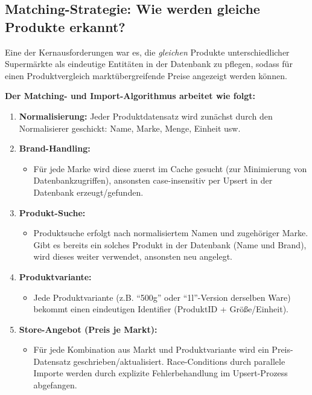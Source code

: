 \documentclass[12pt, a4paper]{report} %
\begin{document}
\subsection{Matching-Strategie: Wie werden gleiche Produkte erkannt?}

Eine der Kernausforderungen war es, die \emph{gleichen} Produkte unterschiedlicher Supermärkte als eindeutige Entitäten in der Datenbank zu pflegen, sodass für einen Produktvergleich marktübergreifende Preise angezeigt werden können.

\textbf{Der Matching- und Import-Algorithmus arbeitet wie folgt:}
\begin{enumerate}
    \item \textbf{Normalisierung:} Jeder Produktdatensatz wird zunächst durch den Normalisierer geschickt: Name, Marke, Menge, Einheit usw.
    \item \textbf{Brand-Handling:}
        \begin{itemize}
            \item Für jede Marke wird diese zuerst im Cache gesucht (zur Minimierung von Datenbankzugriffen), ansonsten case-insensitiv per Upsert in der Datenbank erzeugt/gefunden.
        \end{itemize}
    \item \textbf{Produkt-Suche:}
        \begin{itemize}
            \item Produktsuche erfolgt nach normalisiertem Namen und zugehöriger Marke. Gibt es bereits ein solches Produkt in der Datenbank (Name und Brand), wird dieses weiter verwendet, ansonsten neu angelegt.
        \end{itemize}
    \item \textbf{Produktvariante:}
        \begin{itemize}
            \item Jede Produktvariante (z.B. "`500g"' oder "`1l"'-Version derselben Ware) bekommt einen eindeutigen Identifier (ProduktID + Größe/Einheit).
        \end{itemize}
    \item \textbf{Store-Angebot (Preis je Markt):}
        \begin{itemize}
            \item Für jede Kombination aus Markt und Produktvariante wird ein Preis-Datensatz geschrieben/aktualisiert. Race-Conditions durch parallele Importe werden durch explizite Fehlerbehandlung im Upsert-Prozess abgefangen.
        \end{itemize}

\end{enumerate}
\end{document}
